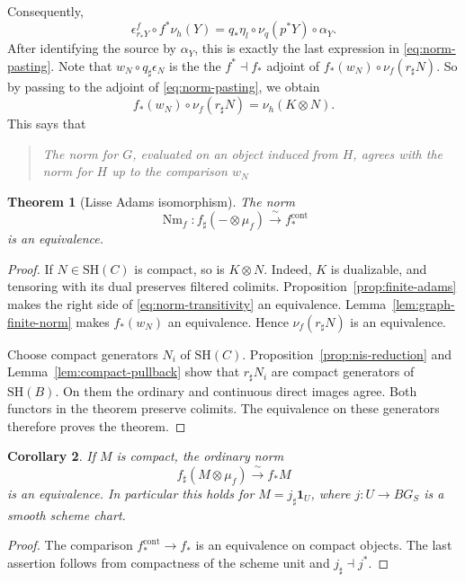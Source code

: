 \documentclass[11pt,reqno]{amsart}
\newtheorem{theorem}{Theorem}[section]
\newtheorem{corollary}[theorem]{Corollary}
\theoremstyle{definition}
\theoremstyle{remark}
\theoremstyle{plain}
\numberwithin{equation}{section}
\newcommand{\SH}{\mathrm{SH}}
\newcommand{\one}{\mathbf 1}
\newcommand{\Nm}{\operatorname{Nm}}
\newcommand{\cont}{\mathrm{cont}}
\begin{document}
Consequently,
\[
 \epsilon^f_{r_*Y}\circ f^*\nu_h(Y)
 =
 q_*\eta_l\circ\nu_q(p^*Y)\circ\alpha_Y.
\]
After identifying the source by \(\alpha_Y\), this is exactly
the last expression in \eqref{eq:norm-pasting}.
Note that \(w_N\circ q_\sharp\epsilon_N\) is the the
\(f^*\dashv f_*\) adjoint of \(f_*(w_N)\circ\nu_f(r_\sharp N)\). 
So by passing to the adjoint of \eqref{eq:norm-pasting}, we obtain
\begin{equation}\label{eq:norm-transitivity}
 f_*(w_N)\circ\nu_f(r_\sharp N)=\nu_h(K\otimes N).
\end{equation}
This says that 
\begin{quote}
\itshape
The norm for \(G\), evaluated on an object induced from \(H\), agrees with the norm for \(H\)
up to the comparison \(w_N\)
\end{quote}

\begin{theorem}[Lisse Adams isomorphism]\label{thm:lisse-adams}
The norm
\[
 \Nm_f:f_\sharp(-\otimes\mu_f)\xrightarrow{\ \sim\ }f_*^{\cont}
\]
is an equivalence.
\end{theorem}
\begin{proof}
If \(N\in\SH(C)\) is compact, so is \(K\otimes N\).
Indeed, \(K\) is dualizable, and tensoring with its dual preserves filtered colimits.
Proposition~\ref{prop:finite-adams} makes the right side of \eqref{eq:norm-transitivity} an equivalence.
Lemma~\ref{lem:graph-finite-norm} makes \(f_*(w_N)\) an equivalence.
Hence \(\nu_f(r_\sharp N)\) is an equivalence.

Choose compact generators \(N_i\) of \(\SH(C)\).
Proposition~\ref{prop:nis-reduction} and Lemma~\ref{lem:compact-pullback}
show that \(r_\sharp N_i\) are compact generators of \(\SH(B)\).
On them the ordinary and continuous direct images agree.
Both functors in the theorem preserve colimits.
The equivalence on these generators therefore proves the theorem.
\end{proof}

\begin{corollary}\label{cor:compact-adams}
If \(M\) is compact, the ordinary norm
\[
 f_\sharp(M\otimes\mu_f)\xrightarrow{\ \sim\ }f_*M
\]
is an equivalence.
In particular this holds for \(M=j_\sharp\one_U\), where \(j:U\to BG_S\) is a smooth scheme chart.
\end{corollary}
\begin{proof}
The comparison \(f_*^{\cont}\to f_*\) is an equivalence on compact objects.
The last assertion follows from compactness of the scheme unit and \(j_\sharp\dashv j^*\).
\end{proof}
\end{document}
